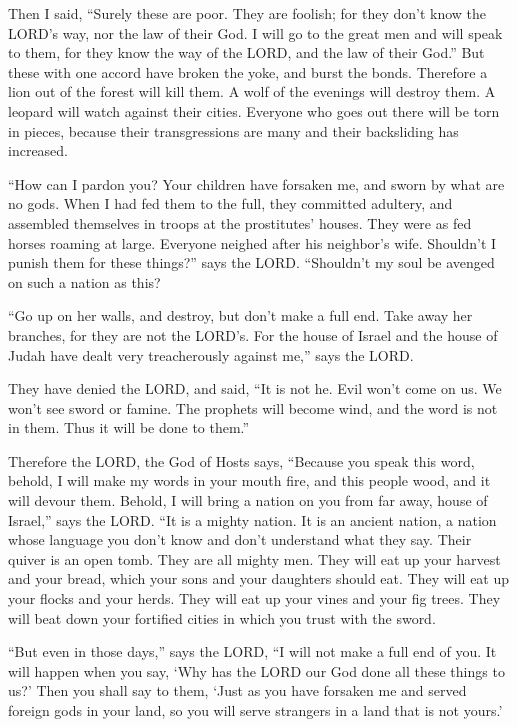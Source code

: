 \myverse{}Then I said, “Surely these are poor. They are foolish; for they don’t know the LORD’s way, nor the law of their God. \myverse{}I will go to the great men and will speak to them, for they know the way of the LORD, and the law of their God.” But these with one accord have broken the yoke, and burst the bonds. \myverse{}Therefore a lion out of the forest will kill them. A wolf of the evenings will destroy them. A leopard will watch against their cities. Everyone who goes out there will be torn in pieces, because their transgressions are many and their backsliding has increased.


\myverse{}“How can I pardon you? Your children have forsaken me, and sworn by what are no gods. When I had fed them to the full, they committed adultery, and assembled themselves in troops at the prostitutes’ houses. \myverse{}They were as fed horses roaming at large. Everyone neighed after his neighbor’s wife. \myverse{}Shouldn’t I punish them for these things?” says the LORD. “Shouldn’t my soul be avenged on such a nation as this?


\myverse{}“Go up on her walls, and destroy, but don’t make a full end. Take away her branches, for they are not the LORD’s. \myverse{}For the house of Israel and the house of Judah have dealt very treacherously against me,” says the LORD.


\myverse{}They have denied the LORD, and said, “It is not he. Evil won’t come on us. We won’t see sword or famine. \myverse{}The prophets will become wind, and the word is not in them. Thus it will be done to them.”


\myverse{}Therefore the LORD, the God of Hosts says, “Because you speak this word, behold, I will make my words in your mouth fire, and this people wood, and it will devour them. \myverse{}Behold, I will bring a nation on you from far away, house of Israel,” says the LORD. “It is a mighty nation. It is an ancient nation, a nation whose language you don’t know and don’t understand what they say. \myverse{}Their quiver is an open tomb. They are all mighty men. \myverse{}They will eat up your harvest and your bread, which your sons and your daughters should eat. They will eat up your flocks and your herds. They will eat up your vines and your fig trees. They will beat down your fortified cities in which you trust with the sword.


\myverse{}“But even in those days,” says the LORD, “I will not make a full end of you. \myverse{}It will happen when you say, ‘Why has the LORD our God done all these things to us?’ Then you shall say to them, ‘Just as you have forsaken me and served foreign gods in your land, so you will serve strangers in a land that is not yours.’


